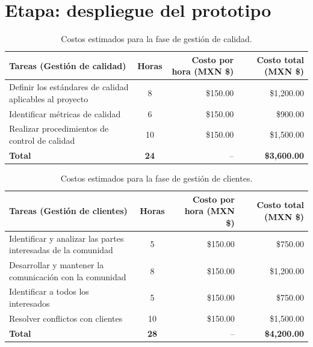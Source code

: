 \section{Etapa: despliegue del prototipo}
\begin{table}[H]
	\centering
	\renewcommand{\arraystretch}{1.6}
	\setlength{\tabcolsep}{10pt}
	\Huge
	\begin{adjustbox}{max width=\textwidth}
		\begin{tabular}{|p{9.5cm}|c|r|r|}
			\hline
			\textbf{Tareas (Gestión de calidad)} & \textbf{Horas} & \textbf{Costo por hora (MXN \$)} & \textbf{Costo total (MXN \$)} \\ \hline
			Definir los estándares de calidad aplicables al proyecto & 8 & \$150.00 & \$1,200.00 \\ \hline
			Identificar métricas de calidad & 6 & \$150.00 & \$900.00 \\ \hline
			Realizar procedimientos de control de calidad & 10 & \$150.00 & \$1,500.00 \\ \hline
			\textbf{Total} & \textbf{24} & -- & \textbf{\$3,600.00} \\ \hline
		\end{tabular}
	\end{adjustbox}
	\caption{Costos estimados para la fase de gestión de calidad.}
	\label{tab:costos_calidad_nuevo}
\end{table}

\begin{table}[H]
	\centering
	\renewcommand{\arraystretch}{1.6}
	\setlength{\tabcolsep}{10pt}
	\Huge
	\begin{adjustbox}{max width=\textwidth}
		\begin{tabular}{|p{9.5cm}|c|r|r|}
			\hline
			\textbf{Tareas (Gestión de clientes)} & \textbf{Horas} & \textbf{Costo por hora (MXN \$)} & \textbf{Costo total (MXN \$)} \\ \hline
			Identificar y analizar las partes interesadas de la comunidad & 5 & \$150.00 & \$750.00 \\ \hline
			Desarrollar y mantener la comunicación con la comunidad & 8 & \$150.00 & \$1,200.00 \\ \hline
			Identificar a todos los interesados & 5 & \$150.00 & \$750.00 \\ \hline
			Resolver conflictos con clientes & 10 & \$150.00 & \$1,500.00 \\ \hline
			\textbf{Total} & \textbf{28} & -- & \textbf{\$4,200.00} \\ \hline
		\end{tabular}
	\end{adjustbox}
	\caption{Costos estimados para la fase de gestión de clientes.}
	\label{tab:costos_clientes_nuevo}
\end{table}

